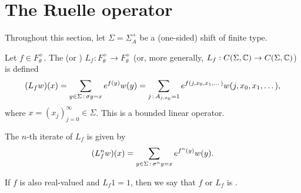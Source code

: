 \begin{comment}
If a function $f : \Sigma \to \complex$ is $\alpha$-H\"older continuous, $\alpha \in (0, 1]$, then it is a Lipschitz function with respect to $d_{\theta^\alpha}$.

Suppose we have $0 < \theta < \theta' < 1$. Then
\[
	F_{\theta'}(\Sigma) \supset F_\theta(\Sigma) \quad \text{and} \quad F_{\theta'}^+(\Sigma^+) \supset F_\theta^+(\Sigma^+).
\]
We can therefore define
\[
	F = \bigcup_{0 < \theta < 1}{F_\theta(\Sigma)} \quad \text{and} \quad F^+ = \bigcup_{0 < \theta < 1}{F_\theta^+(\Sigma^+)},
\]
the spaces of all H\"older continuous functions.


We now consider a class of functions lying in $F_\theta^+$ for all $0 < \theta < 1$. For all $m \geq 1$ we define
\[
	F_m^+ = \{f : \Sigma^+ \to \complex \mid f(x) = f(y) \text{ if } x_j = y_j, \text{ for all } 0 \leq j < m\},
\]
the set of all locally constant functions which depend on the first $m$ terms of $x \in \Sigma^+$. It is clear that
\[
	F_1^+ \subset F_2^+ \subset F_3^+ \subset \dots.
\]
and, for $f \in F_m^+$, $\var_m(f) = 0$. Hence
\[
	\bigcup_{m = 1}^\infty{F_m^+} \subset \bigcap_{0 < \theta < 1}{F_\theta^+}.
\]

\begin{proposition}
	Suppose $0 < \theta < \theta' < 1$. Then for all $m \geq 0$ we have
	\begin{equation*}
		|f - f_m|_{\theta'} \leq |f|_\theta \left(\frac{\theta}{\theta'}\right)^m.
	\end{equation*}
\end{proposition}
\end{comment}

\section{The Ruelle operator}
Throughout this section, let $\Sigma = \Sigma_A^+$ be a (one-sided) shift of finite type.

\begin{definition}
	Let $f \in F_\theta^+$. The  (or ) $L_f : F_\theta^+ \to F_\theta^+$ (or, more generally, $L_f : C(\Sigma, \mathbb{C}) \to C(\Sigma, \mathbb{C})$) is defined
	\[
		(L_f{w})(x) = \sum_{y \in \Sigma \,:\, \sigma{y} = x}{e^{f(y)} w(y)} = \sum_{j \,:\, A_{j, x_0} = 1}{e^{f(j, x_0, x_1, \dots)} w(j, x_0, x_1, \dots)},
	\]
	where $x = (x_j)_{j = 0}^\infty \in \Sigma$. This is a bounded linear operator.
	
	The $n$-th iterate of $L_f$ is given by
	\[
		(L_f^n{w})(x) = \sum_{y \in \Sigma \,:\, \sigma^n{y} = x}{e^{f^n(y)} w(y)}.
	\]
	
	If $f$ is also real-valued and $L_f{1} = 1$, then we say that $f$ or $L_f$ is .
\end{definition}

